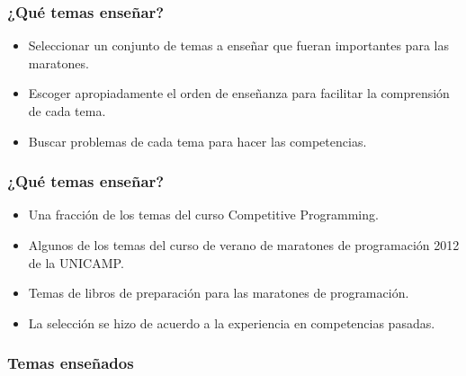 \documentclass{beamer}
\begin{document}
	\begin{frame}
		\frametitle{¿Qué temas enseñar?}
		\begin{itemize}
			\item Seleccionar un conjunto de temas a enseñar que fueran importantes para las maratones.
			\item Escoger apropiadamente el orden de enseñanza para facilitar la comprensión de cada tema.
			\item Buscar problemas de cada tema para hacer las competencias.
		\end{itemize}
	\end{frame}
	
	\begin{frame}
		\frametitle{¿Qué temas enseñar?}
		\begin{itemize}
			\item Una fracción de los temas del curso Competitive Programming.
			\item Algunos de los temas del curso de verano de maratones de programación 2012 de la UNICAMP.
			\item Temas de libros de preparación para las maratones de programación.
			\item La selección se hizo de acuerdo a la experiencia en competencias pasadas.
		\end{itemize}
	\end{frame}
	
	\begin{frame}[fragile]
		\frametitle{Temas enseñados}
	\end{frame}
	
\end{document}
